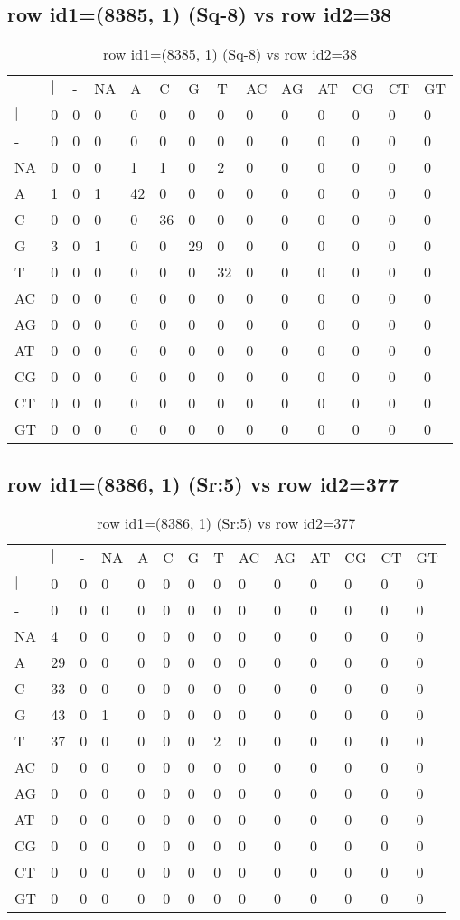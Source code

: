 \subsection{row id1=(8385, 1) (Sq-8) vs row id2=38}
\begin{center}
\begin{longtable}{|l|l|l|l|l|l|l|l|l|l|l|l|l|l|}
\caption{row id1=(8385, 1) (Sq-8) vs row id2=38} \label{table_dm430}\\
\hline
\\
\hline
&$|$&-&NA&A&C&G&T&AC&AG&AT&CG&CT&GT\\
$|$&0&0&0&0&0&0&0&0&0&0&0&0&0\\
-&0&0&0&0&0&0&0&0&0&0&0&0&0\\
NA&0&0&0&1&1&0&2&0&0&0&0&0&0\\
A&1&0&1&42&0&0&0&0&0&0&0&0&0\\
C&0&0&0&0&36&0&0&0&0&0&0&0&0\\
G&3&0&1&0&0&29&0&0&0&0&0&0&0\\
T&0&0&0&0&0&0&32&0&0&0&0&0&0\\
AC&0&0&0&0&0&0&0&0&0&0&0&0&0\\
AG&0&0&0&0&0&0&0&0&0&0&0&0&0\\
AT&0&0&0&0&0&0&0&0&0&0&0&0&0\\
CG&0&0&0&0&0&0&0&0&0&0&0&0&0\\
CT&0&0&0&0&0&0&0&0&0&0&0&0&0\\
GT&0&0&0&0&0&0&0&0&0&0&0&0&0\\
\hline
\end{longtable}
\end{center}

\subsection{row id1=(8386, 1) (Sr:5) vs row id2=377}
\begin{center}
\begin{longtable}{|l|l|l|l|l|l|l|l|l|l|l|l|l|l|}
\caption{row id1=(8386, 1) (Sr:5) vs row id2=377} \label{table_dm432}\\
\hline
\\
\hline
&$|$&-&NA&A&C&G&T&AC&AG&AT&CG&CT&GT\\
$|$&0&0&0&0&0&0&0&0&0&0&0&0&0\\
-&0&0&0&0&0&0&0&0&0&0&0&0&0\\
NA&4&0&0&0&0&0&0&0&0&0&0&0&0\\
A&29&0&0&0&0&0&0&0&0&0&0&0&0\\
C&33&0&0&0&0&0&0&0&0&0&0&0&0\\
G&43&0&1&0&0&0&0&0&0&0&0&0&0\\
T&37&0&0&0&0&0&2&0&0&0&0&0&0\\
AC&0&0&0&0&0&0&0&0&0&0&0&0&0\\
AG&0&0&0&0&0&0&0&0&0&0&0&0&0\\
AT&0&0&0&0&0&0&0&0&0&0&0&0&0\\
CG&0&0&0&0&0&0&0&0&0&0&0&0&0\\
CT&0&0&0&0&0&0&0&0&0&0&0&0&0\\
GT&0&0&0&0&0&0&0&0&0&0&0&0&0\\
\hline
\end{longtable}
\end{center}


